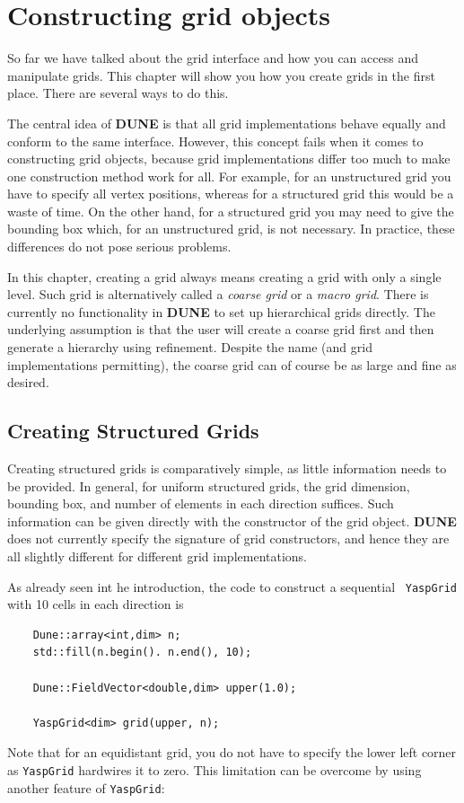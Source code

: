 \documentclass[11pt,a4paper,headinclude,footinclude,DIV16,headings=normal]{scrreprt}
\newcommand{\Dune}{{\sffamily\bfseries DUNE}\xspace}
\begin{document}
\chapter{Constructing grid objects}

So far we have talked about the grid interface and how you can access and
manipulate grids.  This chapter will show you how you create grids in the
first place.  There are several ways to do this.

The central idea of \Dune is that all grid implementations behave equally
and conform to the same interface.  However, this concept fails when it
comes to constructing grid objects, because grid implementations differ too
much to make one construction method work for all.  For example, for an
unstructured grid you have to specify all vertex positions, whereas for a
structured grid this would be a waste of time.  On the other hand, for
a structured grid you may need to give the bounding box which, for an
unstructured grid, is not necessary.  In practice, these differences do
not pose serious problems.

In this chapter, creating a grid always means creating a grid with only
a single level.  Such grid is alternatively called a {\em coarse grid}
or a {\em macro grid}.  There is currently no functionality in \Dune to
set up hierarchical grids directly.  The underlying assumption is that
the user will create a coarse grid first and then generate a hierarchy
using refinement.  Despite the name (and grid implementations permitting),
the coarse grid can of course be as large and fine as desired.

\section{Creating Structured Grids}

Creating structured grids is comparatively simple, as little information
needs to be provided.  In general, for uniform structured grids, the grid
dimension, bounding box, and number of elements in each direction suffices.
Such information can be given directly with the constructor of the grid
object. \Dune does not currently specify the signature of grid constructors,
and hence they are all slightly different for different grid implementations.

As already seen int he introduction, the code to construct a sequential \
\lstinline!YaspGrid! with 10 cells in each direction is
\begin{lstlisting}
    Dune::array<int,dim> n;
    std::fill(n.begin(). n.end(), 10);

    Dune::FieldVector<double,dim> upper(1.0);

    YaspGrid<dim> grid(upper, n);
\end{lstlisting}
Note that for an equidistant grid, you do not have to specify the lower left
corner as \lstinline!YaspGrid! hardwires it to zero. This limitation can be
overcome by using another feature of \lstinline!YaspGrid!:
\end{document}
